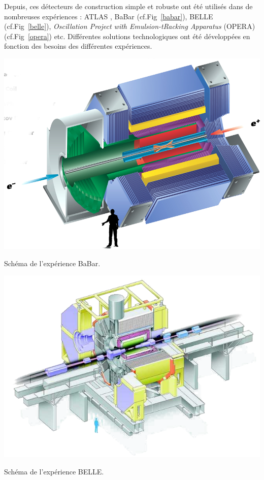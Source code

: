 Depuis, ces détecteurs de construction simple et robuste ont été utilisés dans de nombreuses expériences : ATLAS \cite{ATLAS}, BaBar \cite{Boutigny:1995ib} (cf.Fig~\ref{babar}), BELLE \cite{ABASHIAN2002117} (cf.Fig~\ref{belle}),  \textit{Oscillation Project with Emulsion-tRacking Apparatus} (OPERA) \cite{1748-0221-9-10-C10003} (cf.Fig~\ref{opera}) etc. Différentes solutions technologiques ont été développées en fonction des besoins des différentes expériences.

\marginpar
{
	\centering
	\includegraphics[width=\marginparwidth]{RPC/babar.png}
	\captionsetup{type=figure}\caption{Schéma de l'expérience BaBar.}
	\label{babar}
}

\marginpar
{
	\centering
	\includegraphics[width=\marginparwidth]{RPC/belle.png}
	\captionsetup{type=figure}\caption{Schéma de l'expérience BELLE.}
	\label{belle}
}

